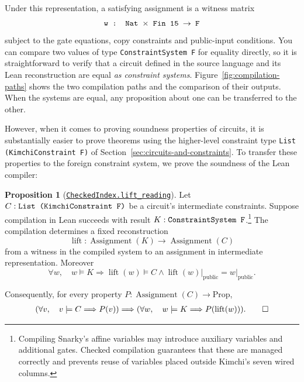 \documentclass[11pt,a4paper]{article}
\newcommand{\inlinecode}[1]{\mbox{\texttt{#1}}}
\newcommand{\restrict}[2]{\left.#1\right\rvert_{#2}}
\theoremstyle{definition}
\theoremstyle{insetstatement}
\newtheorem{propositiontext}[example]{Proposition}
\newenvironment{statementblock}
  {\begin{list}{}{%
    \setlength{\leftmargin}{0pt}%
    \setlength{\rightmargin}{0pt}%
    \setlength{\labelwidth}{0pt}%
    \setlength{\labelsep}{0pt}%
    \setlength{\itemindent}{0pt}%
    \setlength{\listparindent}{0pt}%
    \setlength{\topsep}{.7\baselineskip plus 2pt minus 1pt}%
    \setlength{\partopsep}{0pt}%
    \setlength{\parsep}{0pt}%
    \setlength{\itemsep}{0pt}}%
    \item\relax}
  {\end{list}}
\newenvironment{proposition}[1][]
  {\begin{statementblock}\begin{propositiontext}[{#1}]\pushQED{\qed}}
  {\popQED\end{propositiontext}\end{statementblock}}
\begin{document}
Under this representation, a satisfying assignment is a witness matrix
\[
  \text{\inlinecode{w : Nat $\times$ Fin 15 $\to$ F}}
\]
subject to the gate equations, copy constraints and public-input conditions.
You can compare two values of type \inlinecode{ConstraintSystem F} for equality
directly, so it is straightforward to verify that a circuit defined in the
source language and its Lean reconstruction are equal \textit{as constraint systems}.
Figure~\ref{fig:compilation-paths} shows the two compilation paths and the
comparison of their outputs. When the systems are equal, any proposition
about one can be transferred to the other.

However, when it comes to proving soundness properties of circuits, it is substantially
easier to prove theorems using the higher-level constraint type
\inlinecode{List (KimchiConstraint F)} of Section~\ref{sec:circuits-and-constraints}.
To transfer these properties to the foreign constraint system, we prove
the soundness of the Lean compiler:

\begin{proposition}[\href{https://github.com/l-adic/snarky/blob/main/formal/snarky/Snarky/Kimchi/Backend/CheckedCompile.lean\#L177}{\inlinecode{CheckedIndex.lift\_reading}}]
\label{prop:compiler-soundness}
Let $C : \text{\inlinecode{List (KimchiConstraint F)}}$ be a circuit's intermediate
constraints. Suppose compilation in Lean succeeds with result
$K : \text{\inlinecode{ConstraintSystem F}}$.\footnote{Compiling Snarky's affine
  variables may introduce auxiliary variables and additional gates. Checked
  compilation guarantees that these are managed correctly and prevents reuse
  of variables placed outside Kimchi's seven wired columns.}
The compilation determines a fixed reconstruction
\[
  \operatorname{lift} : \operatorname{Assignment}(K)
    \to \operatorname{Assignment}(C)
\]
from a witness in the compiled system to an assignment in intermediate
representation. Moreover
\[
  \forall w,\quad w\models K \Longrightarrow
  \operatorname{lift}(w)\models C
  \land \restrict{\operatorname{lift}(w)}{\mathrm{public}}
    = \restrict{w}{\mathrm{public}}.
\]

Consequently, for every property
$P : \operatorname{Assignment}(C) \to \mathrm{Prop}$,
\[
  \begin{gathered}
    (\forall v,\quad v\models C \Longrightarrow P(v))
    \Longrightarrow
    (\forall w,\quad w\models K
      \Longrightarrow P(\operatorname{lift}(w))).
  \end{gathered}
  \qedhere
\]
\end{proposition}
\end{document}
